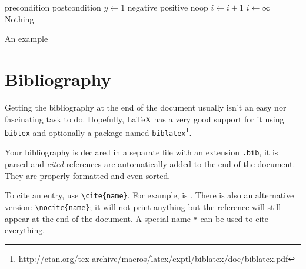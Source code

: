 \begin{algorithm}[H]
\begin{algorithmic}[1]
\Require precondition
\Ensure postcondition
\State $y \gets 1$
	\State negative
	\State positive
\Else
	\State noop
\EndIf
{}
	\State $i \gets i + 1$
\EndFor
\Loop
	\State $i \gets \infty$
	\State {}
\EndLoop
\Statex
{}
	\State \Return Nothing
\EndFunction
\end{algorithmic}
\caption{An example}
\label{alg:example}
\end{algorithm}

\section{Bibliography}

Getting the bibliography at the end of the document usually isn't an easy nor
fascinating task to do.
Hopefully, \LaTeX{} has a very good support for it using \texttt{bibtex} and
optionally a package named
\texttt{biblatex}\footnote{\url{http://ctan.org/tex-archive/macros/latex/exptl/biblatex/doc/biblatex.pdf}}.

Your bibliography is declared in a separate file with an extension
\texttt{.bib}, it is parsed and \emph{cited} references are automatically added
to the end of the document.
They are properly formatted and even sorted.

To cite an entry, use \lstinline!\cite{name}!.
For example,  is
\cite{latex-comprehensive-symbol}.
There is also an alternative version: \lstinline!\nocite{name}!;
it will not print anything but the reference will still appear at the end of the
document.
A special name \texttt{*} can be used to cite everything.
